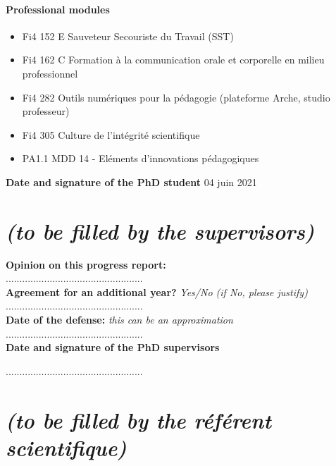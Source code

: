 \documentclass[12pt]{article}
\newcommand{\commentaire}[1]{\small\textit{#1}}
\begin{document}
\paragraph{\footnotesize Professional modules}
  \begin{itemize}
      \itemsep0em
      \item Fi4 152 E Sauveteur Secouriste du Travail (SST)
      \item Fi4 162 C Formation à la communication orale et corporelle en milieu professionnel
      \item Fi4 282 Outils numériques pour la pédagogie (plateforme Arche, studio professeur)
      \item Fi4 305 Culture de l’intégrité scientifique
      \item PA1.1 MDD 14 - Eléments d’innovations pédagogiques
  \end{itemize}

\noindent\textbf{Date and signature of the PhD student}
04 juin 2021

\newpage
\section*{ \textit{\small (to be filled by the supervisors)}}

\noindent\textbf{Opinion on this progress report:}\\
..................................................
\\

\noindent\textbf{Agreement for an additional year?}
\commentaire{%
  Yes/No (if No, please justify)\\}
..................................................
\\

\noindent\textbf{Date of the defense:}
\commentaire{%
  this can be an approximation\\}
..................................................
\\


\noindent\textbf{Date and signature of the PhD supervisors}

..................................................

\newpage
\section*{ \textit{\small (to be filled by the ré\-fé\-rent scientifique)}}
\end{document}
